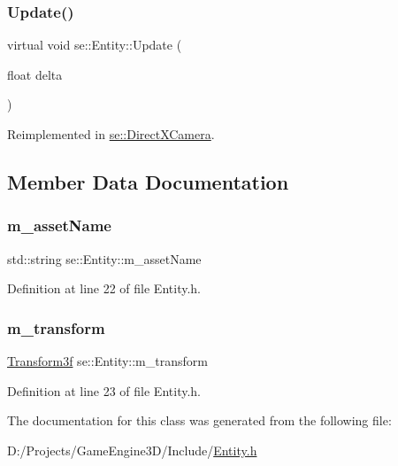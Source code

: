 \mbox{\label{classse_1_1_entity_a1cd277c4c5a517f5cde8b72d5c40a8f0}} 
\subsubsection{\texorpdfstring{Update()}{Update()}}
{\footnotesize\ttfamily virtual void se\+::\+Entity\+::\+Update (\begin{DoxyParamCaption}\item[{float}]{delta }\end{DoxyParamCaption})\hspace{0.3cm}{\ttfamily [virtual]}}



Reimplemented in \mbox{\hyperlink{classse_1_1_direct_x_camera_ae313a5d5a4d2c1b88e5f40285b31b921}{se\+::\+Direct\+X\+Camera}}.



\subsection{Member Data Documentation}
\mbox{\label{classse_1_1_entity_aba1f7cc3700caee65b20c423185ab7ca}} 
\subsubsection{\texorpdfstring{m\+\_\+asset\+Name}{m\_assetName}}
{\footnotesize\ttfamily std\+::string se\+::\+Entity\+::m\+\_\+asset\+Name\hspace{0.3cm}{\ttfamily [protected]}}



Definition at line 22 of file Entity.\+h.

\mbox{\label{classse_1_1_entity_a85a408963ce0920c7bc3bfec29266238}} 
\subsubsection{\texorpdfstring{m\+\_\+transform}{m\_transform}}
{\footnotesize\ttfamily \mbox{\hyperlink{classse_1_1_transform3f}{Transform3f}} se\+::\+Entity\+::m\+\_\+transform\hspace{0.3cm}{\ttfamily [protected]}}



Definition at line 23 of file Entity.\+h.



The documentation for this class was generated from the following file\+:\begin{DoxyCompactItemize}
\item 
D\+:/\+Projects/\+Game\+Engine3\+D/\+Include/\mbox{\hyperlink{_entity_8h}{Entity.\+h}}\end{DoxyCompactItemize}
